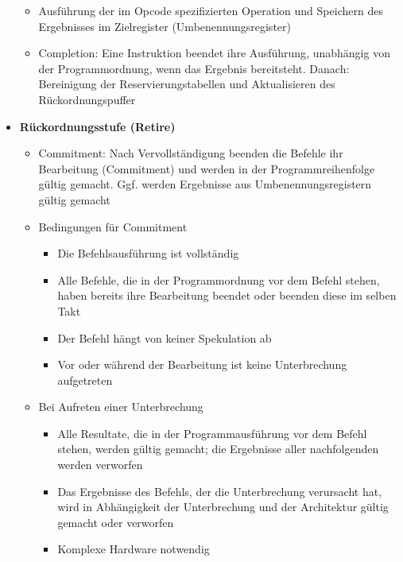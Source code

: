 \begin{itemize}
	\begin{itemize}
		\item Ausführung der im Opcode spezifizierten Operation und Speichern des Ergebnisses im Zielregister (Umbenennungsregister)
		\item Completion: Eine Instruktion beendet ihre Ausführung, unabhängig von der Programmordnung, wenn das Ergebnis bereitsteht. Danach: Bereinigung der Reservierungstabellen und Aktualisieren des Rückordnungspuffer
	\end{itemize}
	\item \textbf{Rückordnungsstufe (Retire)}
	\begin{itemize}
		\item Commitment: Nach Vervollständigung beenden die Befehle ihr Bearbeitung (Commitment) und werden in der Programmreihenfolge gültig gemacht. Ggf. werden Ergebnisse aus Umbenennungsregistern gültig gemacht
		\item Bedingungen für Commitment
		\begin{itemize}
			\item Die Befehlsausführung ist vollständig
			\item Alle Befehle, die in der Programmordnung vor dem Befehl stehen, haben bereits ihre Bearbeitung beendet oder beenden diese im selben Takt
			\item Der Befehl hängt von keiner Spekulation ab
			\item Vor oder während der Bearbeitung ist keine Unterbrechung aufgetreten
		\end{itemize}
		\item Bei Aufreten einer Unterbrechung
		\begin{itemize}
			\item Alle Resultate, die in der Programmausführung vor dem Befehl stehen, werden gültig gemacht; die Ergebnisse aller nachfolgenden werden verworfen
			\item Das Ergebnisse des Befehls, der die Unterbrechung verursacht hat, wird in Abhängigkeit der Unterbrechung und der Architektur gültig gemacht oder verworfen
			\item Komplexe Hardware notwendig
		\end{itemize}
	\end{itemize}
\end{itemize}

